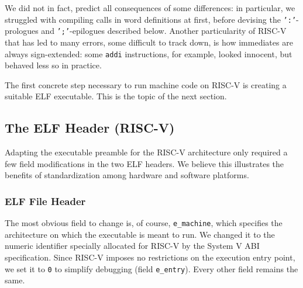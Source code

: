 \documentclass[a4paper,12pt,final]{article}
\begin{document}
We did not in fact, predict all consequences of some differences: in
particular, we struggled with compiling calls in word definitions at
first, before devising the \texttt{':'}-prologues and \texttt{';'}-epilogues
described below.  Another particularity of RISC-V that has led to many
errors, some difficult to track down, is how immediates are always
sign-extended: some \texttt{addi} instructions, for example, looked innocent,
but behaved less so in practice.

The first concrete step necessary to run machine code on RISC-V is
creating a suitable ELF executable.  This is the topic of the next
section.

\subsection{The ELF Header (RISC-V)}
\label{sec:orgf54d09a}

Adapting the executable preamble for the RISC-V architecture only
required a few field modifications in the two ELF headers.  We believe
this illustrates the benefits of standardization among hardware and
software platforms.

\subsubsection{ELF File Header}
\label{sec:org880645c}

The most obvious field to change is, of course, \texttt{e\_machine}, which
specifies the architecture on which the executable is meant to run.
We changed it to the numeric identifier specially allocated for RISC-V
by the System V ABI specification.  Since RISC-V imposes no
restrictions on the execution entry point, we set it to \texttt{0} to
simplify debugging (field \texttt{e\_entry}).  Every other field remains the
same.
\end{document}
